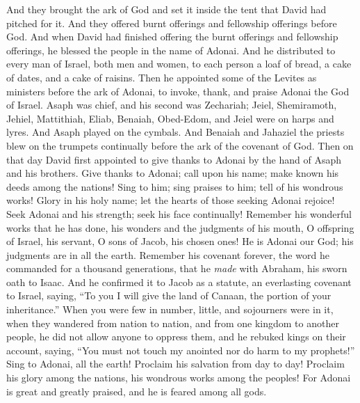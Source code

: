 \begin{biblechapter} %
 And they brought the ark of God and set it inside the tent that David had pitched for it. And they offered burnt offerings and fellowship offerings before God.
\verse And when David had finished offering the burnt offerings and fellowship offerings, he blessed the people in the name of Adonai.
\verse And he distributed to every man of Israel, both men and women, to each person a loaf of bread, a cake of dates, and a cake of raisins.
\verse Then he appointed some of the Levites as ministers before the ark of Adonai, to invoke, thank, and praise Adonai the God of Israel.
\verse Asaph was chief, and his second was Zechariah; Jeiel, Shemiramoth, Jehiel, Mattithiah, Eliab, Benaiah, Obed-Edom, and Jeiel were on harps and lyres. And Asaph played on the cymbals.
\verse And Benaiah and Jahaziel the priests blew on the trumpets continually before the ark of the covenant of God.
\verse Then on that day David first appointed to give thanks to Adonai by the hand of Asaph and his brothers.
 Give thanks to Adonai; call upon his name; 
make known his deeds among the nations!
\verse Sing to him; sing praises to him; 
tell of his wondrous works!
\verse Glory in his holy name; 
let the hearts of those seeking Adonai rejoice!
\verse Seek Adonai and his strength; 
seek his face continually!
\verse Remember his wonderful works that he has done, 
his wonders and the judgments of his mouth,
\verse O offspring of Israel, his servant, 
O sons of Jacob, his chosen ones!
\verse He is Adonai our God; 
his judgments are in all the earth.
\verse Remember his covenant forever, 
the word he commanded for a thousand generations,
\verse that he \textit{made} with Abraham, 
his sworn oath to Isaac.
\verse And he confirmed it to Jacob as a statute, 
an everlasting covenant to Israel,
\verse saying, “To you I will give the land of Canaan, 
the portion of your inheritance.”
\verse When you were few in number, little, 
and sojourners were in it,
\verse when they wandered from nation to nation, 
and from one kingdom to another people,
\verse he did not allow anyone to oppress them, 
and he rebuked kings on their account,
\verse saying, “You must not touch my anointed 
nor do harm to my prophets!”
\verse Sing to Adonai, all the earth! 
Proclaim his salvation from day to day!
\verse Proclaim his glory among the nations, 
his wondrous works among the peoples!
\verse For Adonai is great and greatly praised, 
and he is feared among all gods.

\end{biblechapter}
